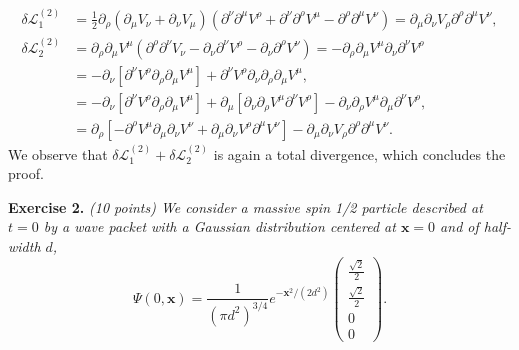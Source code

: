 \begin{equation}
\begin{aligned}
    \delta\mathcal{L}_1^{(2)} &= \frac{1}{2}\partial_\rho(\partial_\mu V_\nu + \partial_\nu V_\mu) \left( \partial^\nu\partial^\mu V^\rho + \partial^\nu\partial^\rho V^\mu - \partial^\rho\partial^\mu V^\nu \right) = \partial_\mu\partial_\nu V_\rho \partial^\rho\partial^\mu V^\nu, \\
    \delta\mathcal{L}_2^{(2)} &= \partial_\rho\partial_\mu V^\mu (\partial^\rho\partial^\nu V_\nu - \partial_\nu\partial^\nu V^\rho - \partial_\nu\partial^\rho V^\nu) = -\partial_\rho\partial_\mu V^\mu \partial_\nu\partial^\nu V^\rho \\
    &= -\partial_\nu \left[ \partial^\nu V^\rho \partial_\rho\partial_\mu V^\mu \right] + \partial^\nu V^\rho \partial_\nu\partial_\rho\partial_\mu V^\mu, \\
    &= -\partial_\nu \left[ \partial^\nu V^\rho \partial_\rho\partial_\mu V^\mu \right] + \partial_\mu \left[ \partial_\nu\partial_\rho V^\mu \partial^\nu V^\rho \right] - \partial_\nu\partial_\rho V^\mu \partial_\mu\partial^\nu V^\rho, \\
    &= \partial_\rho \left[ -\partial^\rho V^\mu \partial_\mu\partial_\nu V^\nu + \partial_\mu\partial_\nu V^\rho \partial^\mu V^\nu \right] - \partial_\mu\partial_\nu V_\rho \partial^\rho\partial^\mu V^\nu.
\end{aligned}
\end{equation}
We observe that $\delta\mathcal{L}_1^{(2)} + \delta\mathcal{L}_2^{(2)}$ is again a total divergence, which concludes the proof.


\textbf{Exercise 2.} \textit{(10 points) We consider a massive spin 1/2 particle described at $t=0$ by a wave packet with a Gaussian distribution centered at $\mathbf{x}=0$ and of half-width $d$,}
\begin{equation}
    \Psi(0, \mathbf{x}) = \frac{1}{(\pi d^2)^{3/4}} e^{-\mathbf{x}^2/(2d^2)} \begin{pmatrix} \frac{\sqrt{2}}{2} \\ \frac{\sqrt{2}}{2} \\ 0 \\ 0 \end{pmatrix}.
\end{equation}

